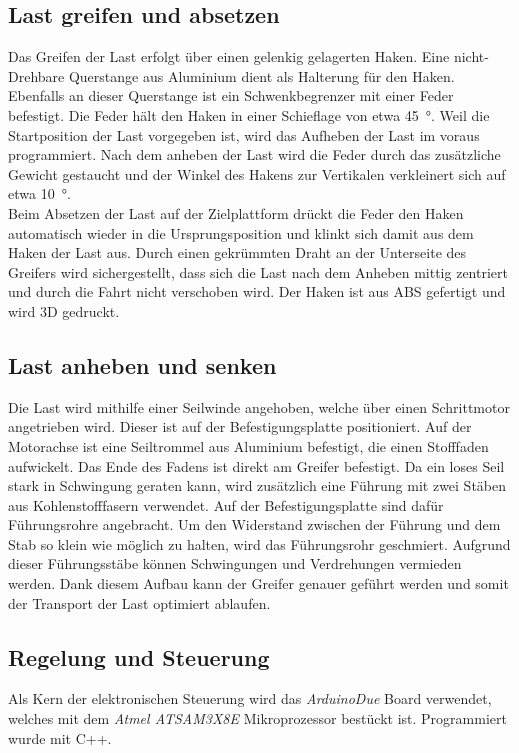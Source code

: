 \documentclass[a4paper]{report}
\begin{document}
\subsection{Last greifen und absetzen}
Das Greifen der Last erfolgt über einen gelenkig gelagerten Haken.  Eine nicht-Drehbare Querstange aus Aluminium dient als Halterung für den Haken. Ebenfalls an dieser Querstange ist ein Schwenkbegrenzer mit einer Feder befestigt. Die Feder hält den Haken in einer Schieflage von etwa 45\SI{}{\degree}. Weil die Startposition der Last vorgegeben ist, wird das Aufheben der Last im voraus programmiert.
Nach dem anheben der Last wird die Feder durch das zusätzliche Gewicht gestaucht und der Winkel des Hakens zur Vertikalen verkleinert sich auf etwa 10\SI{}{\degree}.\\
Beim Absetzen der Last auf der Zielplattform drückt die Feder den Haken automatisch wieder in die Ursprungsposition und klinkt sich damit aus dem Haken der Last aus.
Durch einen gekrümmten Draht an der Unterseite des Greifers wird sichergestellt, dass sich die Last nach dem Anheben mittig zentriert und durch die Fahrt nicht verschoben wird. %
Der Haken ist aus ABS gefertigt und wird 3D gedruckt.

\subsection{Last anheben und senken}
Die Last wird mithilfe einer Seilwinde angehoben, welche über einen Schrittmotor angetrieben wird. Dieser ist auf der Befestigungsplatte positioniert. Auf der Motorachse ist eine Seiltrommel aus Aluminium befestigt, die einen Stofffaden aufwickelt. Das Ende des Fadens ist direkt am Greifer befestigt. %
Da ein loses Seil stark in Schwingung geraten kann, wird zusätzlich eine Führung mit zwei Stäben aus Kohlenstofffasern verwendet. Auf der Befestigungsplatte sind dafür Führungsrohre angebracht. Um den Widerstand zwischen der Führung und dem Stab so klein wie möglich zu halten, wird das Führungsrohr geschmiert. Aufgrund dieser Führungsstäbe können Schwingungen und Verdrehungen vermieden werden.
Dank diesem Aufbau kann der Greifer genauer geführt werden und somit der Transport der Last optimiert ablaufen.



\subsection{Regelung und Steuerung}
Als Kern der elektronischen Steuerung wird das \textit{ArduinoDue} Board verwendet, welches mit dem \textit{Atmel ATSAM3X8E} Mikroprozessor bestückt ist. Programmiert wurde mit C++.
\end{document}
